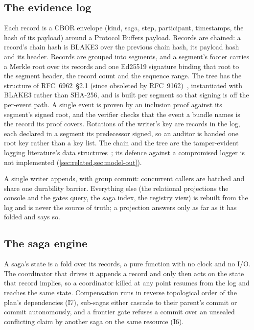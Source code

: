 \subsection{The evidence log}
\label{sec:design-log}
Each record is a CBOR envelope (kind, saga, step, participant, timestamps, the
hash of its payload) around a Protocol Buffers payload. Records are chained: a
record's chain hash is BLAKE3 over the previous chain hash, its payload hash and
its header. Records are grouped into segments, and a segment's footer carries a
Merkle root over its records and one Ed25519 signature binding that root to the
segment header, the record count and the sequence range. The tree has the
structure of RFC~6962~\S2.1 (since obsoleted by RFC~9162)~\cite{rfc6962,rfc9162},
instantiated with BLAKE3 rather than SHA-256, and is built per segment so that
signing is off the per-event path. A single event is proven by an inclusion
proof against its segment's signed root, and the verifier checks that the event a
bundle names is the record its proof covers. Rotations of the writer's key are
records in the log, each declared in a segment its predecessor signed, so an
auditor is handed one root key rather than a key list. The chain and the tree
are the tamper-evident logging literature's data
structures~\cite{schneierkelsey,crosbywallach,haberstornetta}; its defence against
a compromised logger is not implemented (\cref{sec:related,sec:model-out}).

A single writer appends, with group commit: concurrent callers are batched and
share one durability barrier. Everything else (the relational projections the
console and the gates query, the saga index, the registry view) is rebuilt from
the log and is never the source of truth; a projection answers only as far as
it has folded and says so.

\subsection{The saga engine}
A saga's state is a fold over its records, a pure function with no clock and no
I/O. The coordinator that drives it appends a record and only then acts on the
state that record implies, so a coordinator killed at any point resumes from the
log and reaches the same state. Compensation runs in reverse topological order
of the plan's dependencies (I7), sub-sagas either cascade to their parent's
commit or commit autonomously, and a frontier gate refuses a commit over an
unsealed conflicting claim by another saga on the same resource (I6).

